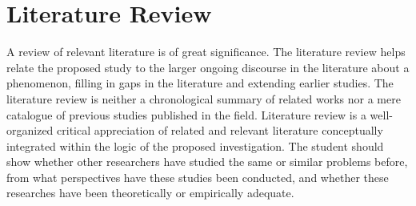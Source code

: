 \section{Literature Review} \label{lit-review}

A review of relevant literature is of great significance.
The literature review helps relate the proposed study to the larger ongoing
discourse in the literature about a phenomenon, filling in gaps in the
literature and extending earlier studies. The literature review is neither a
chronological summary of related works nor a mere catalogue of previous studies
published in the field. Literature review is a well-organized critical
appreciation of related and relevant literature conceptually integrated within
the logic of the proposed investigation. The student should show whether other
researchers have studied the same or similar problems before, from what
perspectives have these studies been conducted, and whether these researches
have been theoretically or empirically adequate.
